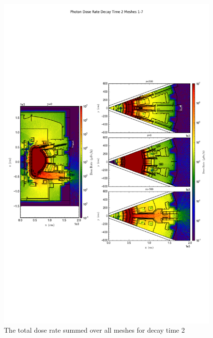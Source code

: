 \documentclass[12pt]{article}
\begin{document}
\begin{figure}[ht!]
\centering
\includegraphics[trim={0cm 9cm 0cm 10cm},clip,scale=0.75]{../plots/final_model_with_b4c/Photon_Dose_Rate_Decay_Time_2_Meshes_1-7.png}
\caption{The total dose rate summed over all meshes for decay time 2}
\label{fig:photons_dc2_b4c_total}
\end{figure}
\end{document}
